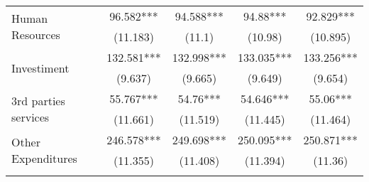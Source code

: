 \begin{table}[H]
\begin{footnotesize}
\begin{center}
{\begin{threeparttable}[b]
\begin{tabular}{rrrrrr}
    \multicolumn{1}{l}{\multirow{2}[0]{*}{Human Resources}} &       & \multicolumn{1}{c}{96.582***} & \multicolumn{1}{c}{94.588***} & \multicolumn{1}{c}{94.88***} & \multicolumn{1}{c}{92.829***} \\
          &       & \multicolumn{1}{c}{(11.183)} & \multicolumn{1}{c}{(11.1)} & \multicolumn{1}{c}{(10.98)} & \multicolumn{1}{c}{(10.895)} \\
    \multicolumn{1}{l}{\multirow{2}[0]{*}{Investiment}} &       & \multicolumn{1}{c}{132.581***} & \multicolumn{1}{c}{132.998***} & \multicolumn{1}{c}{133.035***} & \multicolumn{1}{c}{133.256***} \\
          &       & \multicolumn{1}{c}{(9.637)} & \multicolumn{1}{c}{(9.665)} & \multicolumn{1}{c}{(9.649)} & \multicolumn{1}{c}{(9.654)} \\
    \multicolumn{1}{l}{\multirow{2}[0]{*}{3rd parties services}} &       & \multicolumn{1}{c}{55.767***} & \multicolumn{1}{c}{54.76***} & \multicolumn{1}{c}{54.646***} & \multicolumn{1}{c}{55.06***} \\
          &       & \multicolumn{1}{c}{(11.661)} & \multicolumn{1}{c}{(11.519)} & \multicolumn{1}{c}{(11.445)} & \multicolumn{1}{c}{(11.464)} \\
    \multicolumn{1}{l}{\multirow{2}[0]{*}{Other Expenditures}} &       & \multicolumn{1}{c}{246.578***} & \multicolumn{1}{c}{249.698***} & \multicolumn{1}{c}{250.095***} & \multicolumn{1}{c}{250.871***} \\
          &       & \multicolumn{1}{c}{(11.355)} & \multicolumn{1}{c}{(11.408)} & \multicolumn{1}{c}{(11.394)} & \multicolumn{1}{c}{(11.36)} \\
          &       &       &       &       &  \\
    \bottomrule
    \bottomrule
    \end{tabular}%
    
    
  \label{table:fiscal}%

\end{threeparttable}
}
\end{center}
\end{footnotesize}
\end{table}